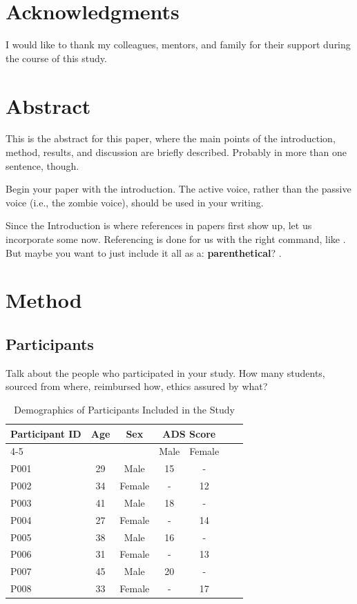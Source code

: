 \documentclass[stu,12pt,floatsintext,a4paper]{apa7}
\begin{document}
\section*{Acknowledgments}
I would like to thank my colleagues, mentors, and family for their support during the course of this study.
\newpage

\section*{Abstract}{This is the abstract for this paper, where the main points of the introduction, method, results, and discussion are briefly described. Probably in more than one sentence, though.}
\newpage

Begin your paper with the introduction. The active voice, rather than the passive voice (i.e., the zombie voice), should be used in your writing.

Since the Introduction is where references in papers first show up, let us incorporate some now. Referencing is done for us with the right command, like  \textcite{Sample2024}. But maybe you want to just include it all as a: \textbf{parenthetical}? \parencite{Fink2021, Contributor2023, Sample2024}.

\section{Method}

\subsection{Participants}

Talk about the people who participated in your study. How many students, sourced from where, reimbursed how, ethics assured by what?

\begin{table}[ht]
\centering
\caption{Demographics of Participants Included in the Study}
\begin{tabular}{lcccccc}
\toprule
\multirow{2}{*}{Participant ID} & \multirow{2}{*}{Age} & \multirow{2}{*}{Sex} & \multicolumn{2}{c}{ADS Score} \\
\cline{4-5}
 & & & Male & Female \\
\midrule
P001 & 29 & Male & 15 & - \\
P002 & 34 & Female & - & 12 \\
P003 & 41 & Male & 18 & - \\
P004 & 27 & Female & - & 14 \\
P005 & 38 & Male & 16 & - \\
P006 & 31 & Female & - & 13 \\
P007 & 45 & Male & 20 & - \\
P008 & 33 & Female & - & 17 \\
\bottomrule
\end{tabular}
\label{tab:demographics-eng}
\end{table}
\end{document}
